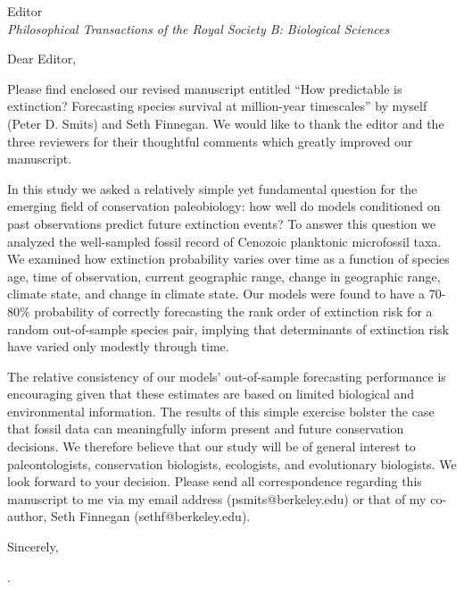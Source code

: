\documentclass{letter}
\begin{document}
\begin{letter}{Editor \\ \textit{Philosophical Transactions of the Royal Society B: Biological Sciences}}
  \opening{Dear Editor,}


Please find enclosed our revised manuscript entitled ``How predictable is extinction? Forecasting species survival at million-year timescales'' by myself (Peter D. Smits) and Seth Finnegan. We would like to thank the editor and the three reviewers for their thoughtful comments which greatly improved our manuscript. 

In this study we asked a relatively simple yet fundamental question for the emerging field of conservation paleobiology: how well do models conditioned on past observations predict future extinction events? To answer this question we analyzed the well-sampled fossil record of Cenozoic planktonic microfossil taxa. We examined how extinction probability varies over time as a function of species age, time of observation, current geographic range, change in geographic range, climate state, and change in climate state. Our models were found to have a 70-80\% probability of correctly forecasting the rank order of extinction risk for a random out-of-sample species pair, implying that determinants of extinction risk have varied only modestly through time. 

The relative consistency of our models’ out-of-sample forecasting performance is encouraging given that these estimates are based on limited biological and environmental information. The results of this simple exercise bolster the case that fossil data can meaningfully inform present and future conservation decisions. We therefore believe that our study will be of general interest to paleontologists, conservation biologists, ecologists, and evolutionary biologists.  We look forward to your decision. Please send all correspondence regarding this manuscript to me via my email address (psmits@berkeley.edu) or that of my co-author, Seth Finnegan (sethf@berkeley.edu).

  \closing{Sincerely,}

  .

\end{letter}
\end{document}
